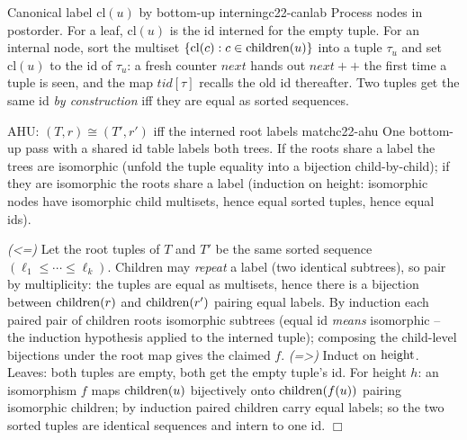 \begin{definition}{Canonical label \(\mathrm{cl}(u)\) by bottom-up interning}{c22-canlab}
Process nodes in postorder.  For a leaf, \(\mathrm{cl}(u)\) is the id interned for the
empty tuple.  For an internal node, sort the multiset
\(\{\mathrm{cl}(c):c\in\operatorname{children}(u)\}\) into a tuple \(\tau_u\) and set \(\mathrm{cl}(u)\) to the
id of \(\tau_u\): a fresh counter \(next\) hands out
\(\mathit{next}++\) the first time a tuple is seen, and the map
\(\mathit{tid}[\tau]\) recalls the old id thereafter.  Two tuples get the same id
\emph{by construction} iff they are equal as sorted sequences.
\end{definition}

\begin{theorem}{AHU: \((T,r)\cong(T',r')\) iff the interned root labels match}{c22-ahu}
One bottom-up pass with a shared id table labels both trees.  If the roots share
a label the trees are isomorphic (unfold the tuple equality into a bijection
child-by-child); if they are isomorphic the roots share a label (induction on
height: isomorphic nodes have isomorphic child multisets, hence equal sorted
tuples, hence equal ids).
\end{theorem}
\begin{proofbox}
\emph{(<=)} Let the root tuples of \(T\) and \(T'\) be the same sorted sequence
\((\ell_1\le\cdots\le\ell_k)\).  Children may \emph{repeat} a label (two
identical subtrees), so pair by multiplicity: the tuples are equal as multisets,
hence there is a bijection between \(\operatorname{children}(r)\) and \(\operatorname{children}(r')\) pairing
equal labels.  By induction each paired pair of children roots isomorphic
subtrees (equal id \emph{means} isomorphic -- the induction hypothesis applied to
the interned tuple); composing the child-level bijections under the root map
gives the claimed \(f\). \emph{(=>)} Induct on \(\operatorname{height}\).  Leaves: both
tuples are empty, both get the empty tuple's id.  For height \(h\): an isomorphism
\(f\) maps \(\operatorname{children}(u)\) bijectively onto \(\operatorname{children}(f(u))\) pairing
isomorphic children; by induction paired children carry equal labels; so the two
sorted tuples are identical sequences and intern to one id. \(\Box\)
\end{proofbox}


